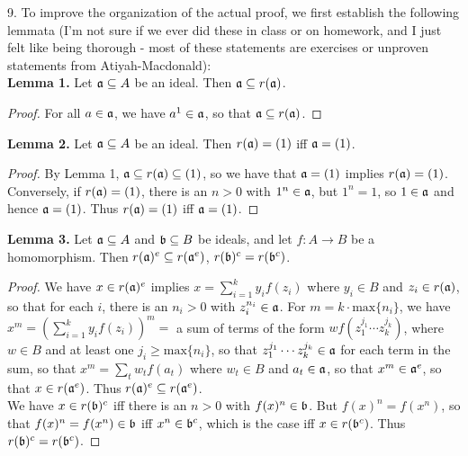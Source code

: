 \documentclass[11pt]{article}
\begin{document}
\num{9.} To improve the organization of the actual proof, we first establish the following lemmata (I'm not sure if we ever did these in class or on homework, and I just felt like being thorough - most of these statements are exercises or unproven statements from Atiyah-Macdonald): \\

{\bf Lemma 1.} Let $\frak{a}\subseteq A$ be an ideal. Then $\frak{a}\subseteq r(\frak{a})$.
\begin{proof} For all $a\in\frak{a}$, we have $a^1\in\frak{a}$, so that $\frak{a}\subseteq r(\frak{a})$.
\end{proof}
{\bf Lemma 2.} Let $\frak{a}\subseteq A$ be an ideal. Then $r(\frak{a})=(1)$ iff $\frak{a}=(1)$.
\begin{proof} By Lemma 1, $\frak{a}\subseteq r(\frak{a})\subseteq (1)$, so we have that $\frak{a}=(1)$ implies $r(\frak{a})=(1)$. Conversely, if $r(\frak{a})=(1)$, there is an $n>0$ with $1^n\in\frak{a}$, but $1^n=1$, so $1\in\frak{a}$ and hence $\frak{a}=(1)$. Thus $r(\frak{a})=(1)$ iff $\frak{a}=(1)$.
\end{proof}
{\bf Lemma 3.} Let $\frak{a}\subseteq A$ and $\frak{b}\subseteq B$ be ideals, and let $f:A\rightarrow B$ be a homomorphism. Then $r(\frak{a})^e\subseteq r(\frak{a}^e)$, $r(\frak{b})^c=r(\frak{b}^c)$.
\begin{proof} We have $x\in r(\frak{a})^e$ implies $x=\sum_{i=1}^k y_if(z_i)$ where $y_i\in B$ and $z_i\in r(\frak{a})$, so that for each $i$, there is an $n_i>0$ with $z_i^{n_i}\in\frak{a}$. For $m=k\cdot\text{max}\{n_i\}$, we have $x^m=\left(\sum_{i=1}^k y_if(z_i)\right)^m = $ a sum of terms of the form $wf(z_1^{j_1}\cdots z_k^{j_k})$, where $w\in B$ and at least one $j_i\geq\text{max}\{n_i\}$, so that $z_1^{j_1}\cdots z_k^{j_k}\in\frak{a}$ for each term in the sum, so that $x^m=\sum_t w_t f(a_t)$ where $w_t\in B$ and $a_t\in \frak{a}$, so that $x^m\in\frak{a}^e$, so that $x\in r(\frak{a}^e)$. Thus $r(\frak{a})^e\subseteq r(\frak{a}^e)$.\\

We have $x\in r(\frak{b})^c$ iff there is an $n>0$ with $f(x)^n\in\frak{b}$. But $f(x)^n=f(x^n)$, so that $f(x)^n=f(x^n)\in\frak{b}$ iff $x^n\in\frak{b}^c$, which is the case iff $x\in r(\frak{b}^c)$. Thus $r(\frak{b})^c=r(\frak{b}^c)$. 
\end{proof}
\end{document}
